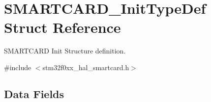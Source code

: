 \hypertarget{struct_s_m_a_r_t_c_a_r_d___init_type_def}{}\section{S\+M\+A\+R\+T\+C\+A\+R\+D\+\_\+\+Init\+Type\+Def Struct Reference}
\label{struct_s_m_a_r_t_c_a_r_d___init_type_def}


S\+M\+A\+R\+T\+C\+A\+RD Init Structure definition.  




{\ttfamily \#include $<$stm32f0xx\+\_\+hal\+\_\+smartcard.\+h$>$}

\subsection*{Data Fields}
